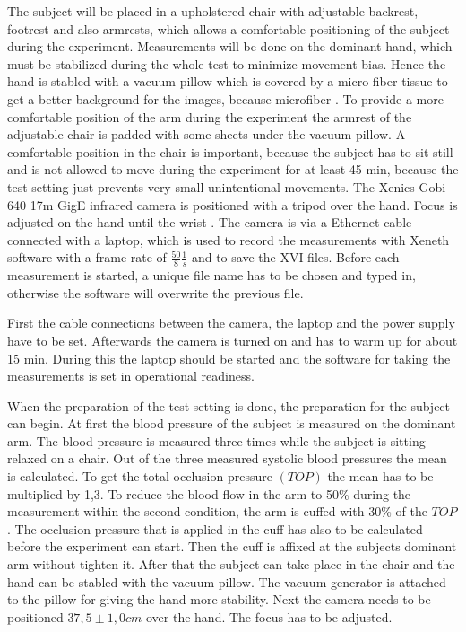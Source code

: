 The subject will be placed in a upholstered chair with adjustable backrest, footrest and also armrests, which allows a comfortable positioning of the subject during the experiment. Measurements will be done on the dominant hand, which must be stabilized during the whole test to minimize movement bias. Hence the hand is stabled with a vacuum pillow which is covered by a micro fiber tissue to get a better background for the images, because microfiber . To provide a more comfortable position of the arm during the experiment the armrest of the adjustable chair is padded with some sheets under the vacuum pillow. A comfortable position in the chair is important, because the subject has to sit still and is not allowed to move during the experiment for at least 45 min, because the test setting just prevents very small unintentional movements.
The Xenics Gobi 640 17\mu m GigE infrared camera is positioned with a tripod over the hand. Focus is adjusted on the hand until the wrist .
The camera is via a Ethernet cable connected with a laptop, which is used to record the measurements with Xeneth software with a frame rate of $ \frac{50}{8} \frac{1}{s} $ and to save the XVI-files. Before each measurement is started, a unique file name has to be chosen and typed in, otherwise the software will overwrite the previous file.

First the cable connections between the camera, the laptop and the power supply have to be set. Afterwards the camera is turned on and has to warm up for about 15 min. During this the laptop should be started and the software for taking the measurements is set in operational readiness. 

When the preparation of the test setting is done, the preparation for the subject can begin. At first the blood pressure of the subject is measured on the dominant arm. The blood pressure is measured three times while the subject is sitting relaxed on a chair. Out of the three measured systolic blood pressures the mean is calculated. To get the total occlusion pressure $(TOP)$ the mean has to be multiplied by 1,3. To reduce the blood flow in the arm to 50\% during the measurement within the second condition, the arm is cuffed with 30\% of the $TOP$ \cite{mouser2017}. The occlusion pressure that is applied in the cuff has also to be calculated before the experiment can start.
Then the cuff is affixed at the subjects dominant arm without tighten it. After that the subject can take place in the chair and the hand can be stabled with the vacuum pillow. The vacuum generator is attached to the pillow for giving the hand more stability. Next the camera needs to be positioned $37,5\pm 1,0 cm$ over the hand. The focus has to be adjusted. 

